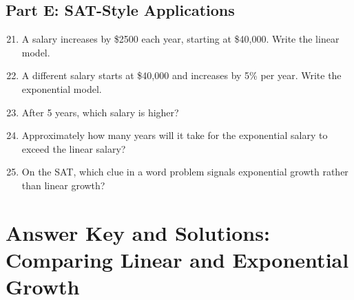 \documentclass[14pt]{extarticle}
\begin{document}
\subsection*{Part E: SAT-Style Applications}

\begin{enumerate}
  \setcounter{enumi}{20}
  \item A salary increases by \$2500 each year, starting at \$40,000. Write the linear model.
  \item A different salary starts at \$40,000 and increases by 5\% per year. Write the exponential model.
  \item After 5 years, which salary is higher?
  \item Approximately how many years will it take for the exponential salary to exceed the linear salary?
  \item On the SAT, which clue in a word problem signals exponential growth rather than linear growth?
\end{enumerate}

\newpage


\section*{Answer Key and Solutions: Comparing Linear and Exponential Growth}
\end{document}
